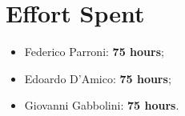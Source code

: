 \chapter{Effort Spent}
\begin{itemize}
\item Federico Parroni: \textbf{75 hours};
\item Edoardo D'Amico: \textbf{75 hours};
\item Giovanni Gabbolini: \textbf{75 hours}.
\end{itemize}

